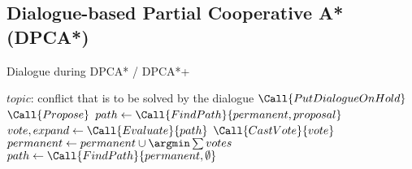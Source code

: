 \subsection{Dialogue-based Partial Cooperative A* (DPCA*)}

\begin{algorithm}[t]
	\caption{Dialogue during DPCA* / DPCA*+}
	\label{alg:dpca}
	\begin{algorithmic}[1]
		\Require $topic$: conflict that is to be solved by the dialogue
			\State $\Call{PutDialogueOnHold}$
		\EndIf
		\Repeat
			\State $\Call{Propose}$
				\State $path \gets \Call{FindPath}{permanent, proposal}$
				\State $vote, expand \gets \Call{Evaluate}{path}$
				\State $\Call{CastVote}{vote}$
			\EndFor
		\State $permanent \gets permanent \cup {\argmin \sum votes}$
		\State $path \gets \Call{FindPath}{permanent, \emptyset}$
	\end{algorithmic}
\end{algorithm}


